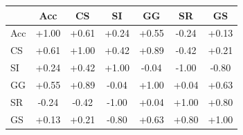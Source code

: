 \begin{tabular}{@{}lcccccc@{}}
\toprule
 & Acc & CS & SI & GG & SR & GS \\
\midrule
Acc & +1.00 & +0.61 & +0.24 & +0.55 & -0.24 & +0.13 \\
CS & +0.61 & +1.00 & +0.42 & +0.89 & -0.42 & +0.21 \\
SI & +0.24 & +0.42 & +1.00 & -0.04 & -1.00 & -0.80 \\
GG & +0.55 & +0.89 & -0.04 & +1.00 & +0.04 & +0.63 \\
SR & -0.24 & -0.42 & -1.00 & +0.04 & +1.00 & +0.80 \\
GS & +0.13 & +0.21 & -0.80 & +0.63 & +0.80 & +1.00 \\
\bottomrule
\end{tabular}
